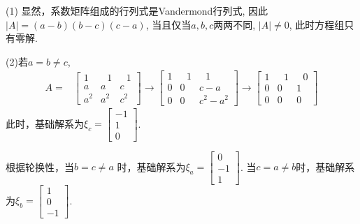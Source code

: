 \documentclass[a4paper]{book}
\begin{document}
 (1) 显然，系数矩阵组成的行列式是Vandermond行列式, 因此$|A|=(a-b)(b-c)(c-a)$, 当且仅当$a,b,c$两两不同, $|A|≠0$, 此时方程组只有零解.

(2)若$a=b\not=c$,
\begin{displaymath}
\begin{aligned}
A=&\begin{bmatrix}1&\ \ \ 1&\ \ \ 1\\a&a&c\\a^2&a^2&c^2 \end{bmatrix}\rightarrow
\begin{bmatrix}1&\ \ \ 1&\ \ \ 1\\0&0&c-a\\0&0&c^2-a^2 \end{bmatrix}\rightarrow
\begin{bmatrix}1&\ \ \ 1&\ \ \ 0\\0&0&1\\0&0&0 \end{bmatrix}
\end{aligned} \end{displaymath}
此时，基础解系为$\xi_c=\begin{bmatrix}-1\\1\\0\end{bmatrix}$.

根据轮换性，当$b=c\not=a$ 时，基础解系为$\xi_a=\begin{bmatrix}0\\-1\\1\end{bmatrix}$. 当$c=a\not=b$时，基础解系为$\xi_b=\begin{bmatrix}1\\0\\-1\end{bmatrix}$.
\end{document}
